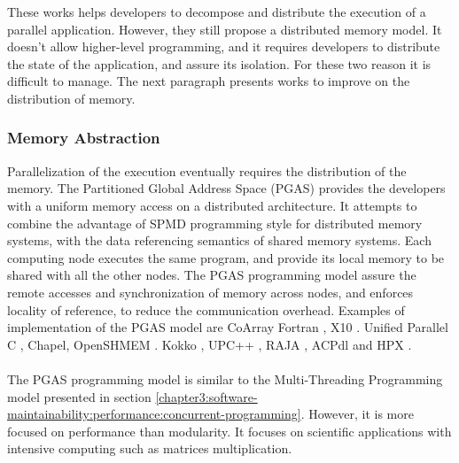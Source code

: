 These works helps developers to decompose and distribute the execution of a parallel application.
However, they still propose a distributed memory model.
It doesn't allow higher-level programming, and it requires developers to distribute the state of the application, and assure its isolation.
For these two reason it is difficult to manage.
The next paragraph presents works to improve on the distribution of memory.


\subsubsection{Memory Abstraction}

Parallelization of the execution eventually requires the distribution of the memory.
The Partitioned Global Address Space (PGAS) provides the developers with a uniform memory access on a distributed architecture.
It attempts to combine the advantage of SPMD programming style for distributed memory systems, with the data referencing semantics of shared memory systems.
Each computing node executes the same program, and provide its local memory to be shared with all the other nodes.
The PGAS programming model assure the remote accesses and synchronization of memory across nodes, and enforces locality of reference, to reduce the communication overhead.
Examples of implementation of the PGAS model are 
CoArray Fortran \cite{Numrich1998},
X10 \cite{Charles2005}.
Unified Parallel C \cite{El-Ghazawi2006},
Chapel\cite{Chamberlain2007},
OpenSHMEM \cite{Chapman2010}.
Kokko \cite{Edwards2012},
UPC++ \cite{Zheng2014},
RAJA \cite{Hornung2014},
ACPdl \cite{Ajima2015} and
HPX \cite{Kaiser2015}.


\paragraph{}


The PGAS programming model is similar to the Multi-Threading Programming model presented in section \ref{chapter3:software-maintainability:performance:concurrent-programming}. 
However, it is more focused on performance than modularity.
It focuses on scientific applications with intensive computing such as matrices multiplication.


